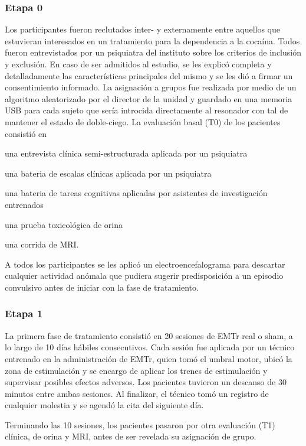 \subsubsection{Etapa 0}
Los participantes fueron reclutados inter- y externamente entre aquellos que estuvieran interesados en un tratamiento para la dependencia a la cocaína.
Todos fueron entrevistados por un psiquiatra del instituto sobre los criterios de inclusión y exclusión.
En caso de ser admitidos al estudio, se les explicó completa y detalladamente las características principales del mismo y se les dió a firmar un consentimiento informado.
La asignación a grupos fue realizada por medio de un algoritmo aleatorizado por el director de la unidad y guardado en una memoria USB para cada sujeto que sería introcida directamente al resonador con tal de mantener el estado de doble-ciego.
La evaluación basal (T0) de los pacientes consistió en
\begin{enumerate*}[label=\emph{\alph*}), before=\unskip{: }, itemjoin={{; }}, itemjoin*={{, y }}]
    \item una entrevista clínica semi-estructurada aplicada por un psiquiatra
    \item una bateria de escalas clínicas aplicada por un psiquiatra
    \item una bateria de tareas cognitivas aplicadas por asistentes de investigación entrenados
    \item una prueba toxicológica de orina
    \item una corrida de MRI.
\end{enumerate*}
A todos los participantes se les aplicó un electroencefalograma para descartar cualquier actividad anómala que pudiera sugerir predisposición a un episodio convulsivo antes de iniciar con la fase de tratamiento.

\subsubsection{Etapa 1}
La primera fase de tratamiento consistió en 20 sesiones de EMTr real o sham, a lo largo de 10 días hábiles consecutivos. Cada sesión fue aplicada por un técnico entrenado en la administración de EMTr, quien tomó el umbral motor, ubicó la zona de estimulación y se encargo de aplicar los trenes de estimulación y supervisar posibles efectos adversos.
Los pacientes tuvieron un descanso de 30 minutos entre ambas sesiones.
Al finalizar, el técnico tomó un registro de cualquier molestia y se agendó la cita del siguiente día.\par
Terminando las 10 sesiones, los pacientes pasaron por otra evaluación (T1) clínica, de orina y MRI, antes de ser revelada su asignación de grupo.

